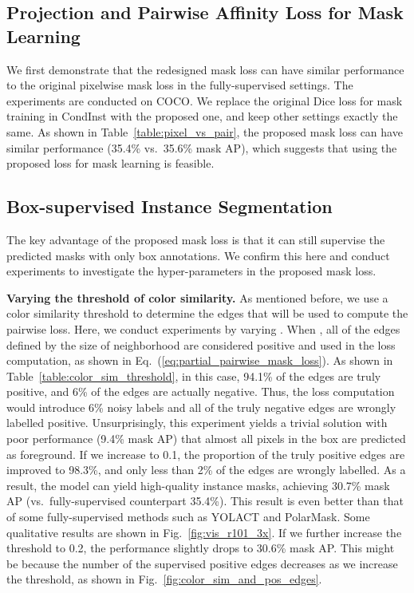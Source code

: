 \documentclass[final]{cvpr}
\newcommand{\1}{{\mathbbm{1}}}
\begin{document}
{\begin{table*}[t!]
\end{table*}

\subsection{Projection and Pairwise Affinity Loss for Mask Learning}
We first demonstrate that the redesigned mask loss can have similar performance to the original pixelwise mask loss in the fully-supervised settings. The experiments are conducted on COCO. We replace the original Dice loss for mask training in CondInst with the proposed one, and keep other settings exactly the same. As shown in Table~\ref{table:pixel_vs_pair}, the proposed mask loss can have similar performance (35.4\% vs.\  35.6\% mask AP), which suggests that using the proposed loss for mask learning is feasible.

\subsection{Box-supervised Instance Segmentation}
The key advantage of the proposed mask loss is that it can still supervise the predicted masks with only box annotations. We confirm this here and conduct experiments to investigate the hyper-parameters in the proposed mask loss.


\noindent\textbf{Varying the threshold of color similarity.} As mentioned before, we use a color similarity threshold  to determine the edges that will be used to compute the pairwise loss. Here, we conduct experiments by varying . When , all of the edges defined by the size of neighborhood are considered positive and used in the loss computation, as shown in Eq.~(\ref{eq:partial_pairwise_mask_loss}).
As shown in Table~\ref{table:color_sim_threshold}, in this case, 94.1\% of the edges are truly positive, and 6\% of the edges are actually negative. Thus, the loss computation would introduce 6\% noisy labels and all of the truly negative edges are wrongly labelled positive. Unsurprisingly, this experiment yields a trivial solution with poor performance (9.4\% mask AP) that almost all pixels in the box are predicted as foreground. If we increase  to 0.1, the proportion of the truly positive edges are improved to 98.3\%, and only less than 2\% of the edges are wrongly labelled. As a result, the model can yield high-quality instance masks, achieving 30.7\% mask AP (vs.\  fully-supervised counterpart 35.4\%). This result is even better than that of some fully-supervised methods such as YOLACT and PolarMask. Some qualitative results are shown in Fig.~\ref{fig:vis_r101_3x}. If we further increase the threshold  to 0.2, the performance slightly drops to 30.6\% mask AP. This might be because the number of the supervised positive edges decreases as we increase the threshold, as shown in Fig.~\ref{fig:color_sim_and_pos_edges}.

}
\end{document}
